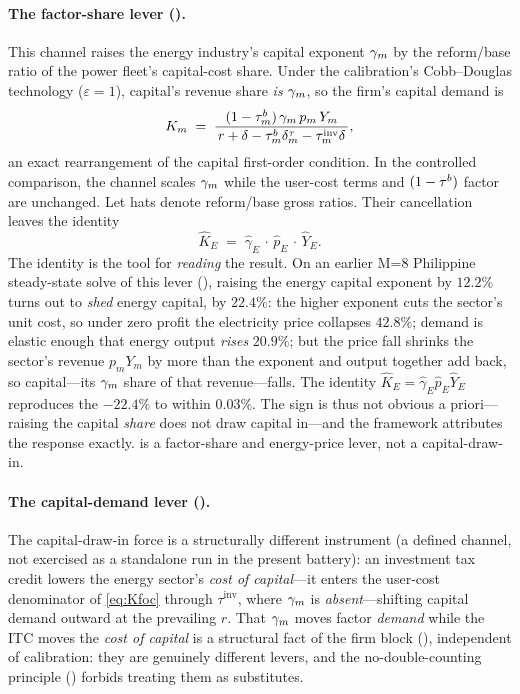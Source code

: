 \paragraph{The factor-share lever ().}
This channel raises the energy industry's capital
exponent $\gamma_{m}$ by the \CLEWS{} reform/base ratio of the power fleet's capital-cost
share. Under the calibration's Cobb--Douglas technology ($\varepsilon=1$), capital's
revenue share \emph{is} $\gamma_{m}$, so the firm's capital demand is
\begin{equation}
  K_m \;=\; \frac{(1-\tau^{b}_{m})\,\gamma_{m}\, p_m\, Y_m}
                 {\,r+\delta-\tau^{b}_{m}\delta^{\tau}_{m}-\tau^{\mathrm{inv}}_{m}\delta\,},
  \label{eq:Kfoc}
\end{equation}
an exact rearrangement of the capital first-order condition. In the controlled comparison,
the channel scales $\gamma_{m}$ while the user-cost terms and $(1-\tau^{b})$ factor are unchanged.
Let hats denote reform/base gross ratios. Their cancellation leaves the identity
\begin{equation}
  \hat K_E \;=\; \hat\gamma_E \,\cdot\, \hat p_E \,\cdot\, \hat Y_E .
  \label{eq:Khat}
\end{equation}
The identity is the tool for \emph{reading} the result. On an earlier M=8 Philippine
steady-state solve of this lever
(), raising the energy capital exponent by $12.2\%$ turns out to
\emph{shed} energy capital, by $22.4\%$: the higher exponent cuts the sector's unit cost,
so under zero profit the electricity price collapses $42.8\%$; demand is elastic enough
that energy output \emph{rises} $20.9\%$; but the price fall shrinks the sector's revenue
$p_m Y_m$ by more than the exponent and output together add back, so capital---its
$\gamma_{m}$ share of that revenue---falls. The identity
$\hat K_E=\hat\gamma_E\hat p_E\hat Y_E$ reproduces the $-22.4\%$ to within $0.03\%$. The
sign is thus not obvious a priori---raising the capital \emph{share} does not draw capital
in---and the framework attributes the response exactly.  is a
factor-share and energy-price lever, not a capital-draw-in.

\paragraph{The capital-demand lever ().}
The capital-draw-in force is a structurally different instrument
(a defined channel, not exercised as a standalone run in
the present battery): an investment tax credit lowers the energy sector's \emph{cost of
capital}---it enters the user-cost denominator of \cref{eq:Kfoc} through
$\tau^{\mathrm{inv}}$, where $\gamma_{m}$ is \emph{absent}---shifting capital demand outward
at the prevailing $r$. That $\gamma_{m}$ moves factor \emph{demand} while the ITC moves the
\emph{cost of capital} is a structural fact of the firm block (), independent
of calibration: they are genuinely different levers, and the no-double-counting principle
() forbids treating them as substitutes.

